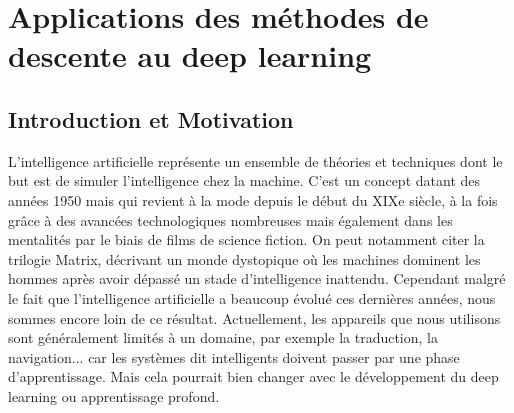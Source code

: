 \chapter{Applications des méthodes de descente au deep learning}
\section{Introduction et Motivation}
L'intelligence artificielle représente un ensemble de théories et techniques dont le but est de simuler l'intelligence chez la machine. C'est un concept datant des années 1950 mais qui revient à la mode depuis le début du XIXe siècle, à la fois grâce à des avancées technologiques nombreuses mais également dans les mentalités par le biais de films de science fiction. On peut notamment citer la trilogie Matrix, décrivant un monde dystopique où les machines dominent les hommes après avoir dépassé un stade d'intelligence inattendu. Cependant malgré le fait que l'intelligence artificielle a beaucoup évolué ces dernières années, nous sommes encore loin de ce résultat. Actuellement, les appareils que nous utilisons sont généralement limités à un domaine, par exemple la traduction, la navigation... car les systèmes dit intelligents doivent passer par une phase d'apprentissage. Mais cela pourrait bien changer avec le développement du deep learning ou apprentissage profond.

